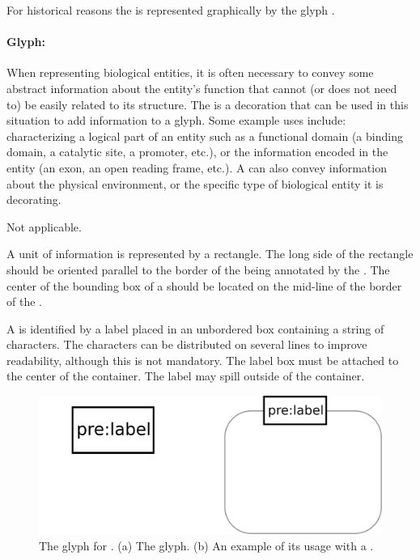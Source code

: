 For historical reasons the  is represented
graphically by the glyph .

\paragraph{Glyph: }
\label{sec:unitInfo}

When representing biological entities, it is often necessary to convey
some abstract information about the entity's function that cannot (or
does not need to) be easily related to its structure.  The  is a decoration that can be used in this situation
to add information to a glyph.  Some example uses include:
characterizing a logical part of an entity such as a functional domain
(a binding domain, a catalytic site, a promoter, etc.), or the
information encoded in the entity (an exon, an open reading frame,
etc.).  A  can also convey information
about the physical environment, or the specific type of biological
entity it is decorating.

\begin{glyphDescription}

\glyphSboTerm Not applicable.

\glyphContainer A unit of information is represented by a rectangle.  The long side of the rectangle should be oriented parallel to the border of the  being annotated by the . The center of the bounding box of a  should be located on the mid-line of the border of the .

\glyphLabel A  is identified by a label placed in an unbordered box containing a string of characters.  The characters can be distributed on several lines to improve readability, although this is not mandatory.  The label box must be attached to the center of the container.  The label may spill outside of the container.


\end{glyphDescription}

\begin{figure}[H]
  \centering
  \includegraphics[scale = 0.3]{images/unitInformation}
  \caption{The \PD glyph for . (a) The
    glyph. (b) An example of its usage with a .}
  \label{fig:unitInfo}
\end{figure}


